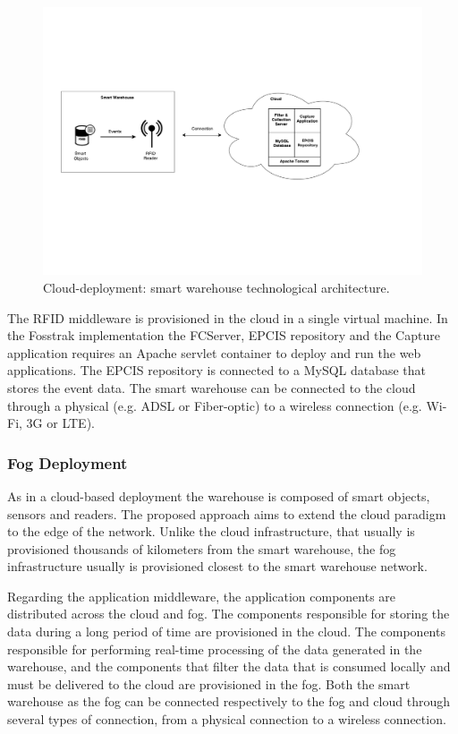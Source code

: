 \begin{figure}[ht!]
\centering
\includegraphics[width=.5\textwidth]{./figures/implementation_cloud_architecture}
\caption{Cloud-deployment: smart warehouse technological architecture.}
\label{fig:implementation_cloud_architecture}
\end{figure}

The \gls{RFID} middleware is provisioned in the cloud in a single virtual machine. In the
Fosstrak implementation the \gls{FCServer}, \gls{EPCIS} repository and the Capture application
requires an Apache servlet container to deploy and run the web applications. The \gls{EPCIS}
repository is connected to a MySQL database that stores the event data. The smart warehouse can be
connected to the cloud through a physical (e.g. \gls{ADSL} or Fiber-optic) to a wireless
connection (e.g. Wi-Fi, 3G or \gls{LTE}).

\subsubsection{Fog Deployment}
\label{subs:sol_fog}
As in a cloud-based deployment the warehouse is composed of smart objects, sensors and readers.
The proposed approach aims to extend the cloud paradigm to the edge of the network. Unlike the
cloud infrastructure, that usually is provisioned thousands of kilometers from the smart warehouse,
the fog infrastructure usually is provisioned closest to the smart warehouse network.

Regarding the application middleware, the application components are distributed across the cloud and
fog. The components responsible for storing the data during a long period of time are provisioned in
the cloud. The components responsible for performing real-time processing of the data generated in the
warehouse, and the components that filter the data that is consumed locally and must be delivered to
the cloud are provisioned in the fog. Both the smart warehouse as the fog can be connected respectively
to the fog and cloud through several types of connection, from a physical connection to a wireless
connection.

